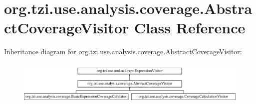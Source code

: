 \hypertarget{classorg_1_1tzi_1_1use_1_1analysis_1_1coverage_1_1_abstract_coverage_visitor}{\section{org.\-tzi.\-use.\-analysis.\-coverage.\-Abstract\-Coverage\-Visitor Class Reference}
\label{classorg_1_1tzi_1_1use_1_1analysis_1_1coverage_1_1_abstract_coverage_visitor}
}
Inheritance diagram for org.\-tzi.\-use.\-analysis.\-coverage.\-Abstract\-Coverage\-Visitor\-:\begin{figure}[H]
\begin{center}
\leavevmode
\includegraphics[height=2.148338cm]{classorg_1_1tzi_1_1use_1_1analysis_1_1coverage_1_1_abstract_coverage_visitor}
\end{center}
\end{figure}
